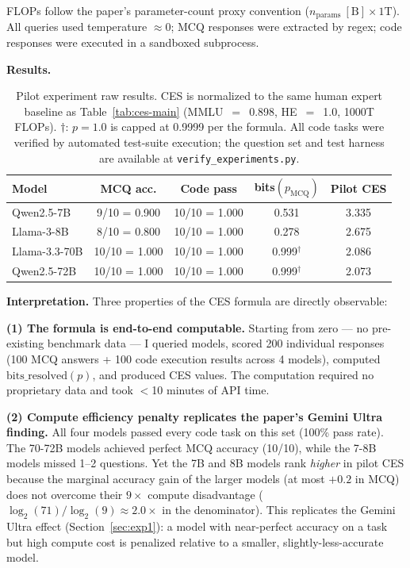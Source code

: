 \documentclass[12pt]{article}
\begin{document}
FLOPs follow the paper's parameter-count proxy convention ($n_{\text{params}}~[\text{B}] \times 1\text{T}$). All queries used temperature $\approx 0$; MCQ responses were extracted by regex; code responses were executed in a sandboxed subprocess.

\textbf{Results.}

\begin{table}[H]
\centering
\begin{tabular}{lcccc}
\toprule
\textbf{Model} & \textbf{MCQ acc.} & \textbf{Code pass} & \textbf{bits}$(p_{\text{MCQ}})$ & \textbf{Pilot CES} \\
\midrule
Qwen2.5-7B    & 9/10 = 0.900 & 10/10 = 1.000 & 0.531 & 3.335 \\
Llama-3-8B    & 8/10 = 0.800 & 10/10 = 1.000 & 0.278 & 2.675 \\
Llama-3.3-70B & 10/10 = 1.000 & 10/10 = 1.000 & 0.999$^\dagger$ & 2.086 \\
Qwen2.5-72B   & 10/10 = 1.000 & 10/10 = 1.000 & 0.999$^\dagger$ & 2.073 \\
\bottomrule
\end{tabular}
\caption{Pilot experiment raw results. CES is normalized to the same human expert baseline as Table~\ref{tab:ces-main} (MMLU~$=$~0.898, HE~$=$~1.0, 1000T FLOPs). $\dagger$: $p = 1.0$ is capped at 0.9999 per the formula. All code tasks were verified by automated test-suite execution; the question set and test harness are available at \texttt{verify\_experiments.py}.}
\label{tab:pilot}
\end{table}

\textbf{Interpretation.} Three properties of the CES formula are directly observable:

\textbf{(1) The formula is end-to-end computable.} Starting from zero --- no pre-existing benchmark data --- I queried models, scored 200 individual responses (100 MCQ answers + 100 code execution results across 4 models), computed $\mathrm{bits\_resolved}(p)$, and produced CES values. The computation required no proprietary data and took $<$10 minutes of API time.

\textbf{(2) Compute efficiency penalty replicates the paper's Gemini Ultra finding.} All four models passed every code task on this set (100\% pass rate). The 70-72B models achieved perfect MCQ accuracy (10/10), while the 7-8B models missed 1--2 questions. Yet the 7B and 8B models rank \textit{higher} in pilot CES because the marginal accuracy gain of the larger models (at most $+0.2$ in MCQ) does not overcome their $9\times$ compute disadvantage ($\log_2(71)/\log_2(9) \approx 2.0\times$ in the denominator). This replicates the Gemini Ultra effect (Section~\ref{sec:exp1}): a model with near-perfect accuracy on a task but high compute cost is penalized relative to a smaller, slightly-less-accurate model.
\end{document}

